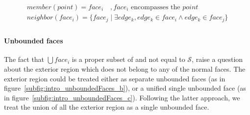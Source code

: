 \[
\begin{array}{l}
  \mathit{member}\left(point\right) = face_i \quad, face_i \text{ encompasses the } point \\
  \mathit{neighbor}\left(face_i\right) = \lbrace  face_j \mid \exists edge_k, edge_k \in face_i \land edge_k \in face_j \rbrace\\
\end{array}
\]

\paragraph{Unbounded faces}
The fact that $\bigcup face_i$ is a proper subset of and not equal to $\mathcal{S}$, raise a question about the exterior region which does not belong to any of the normal faces.
The exterior region could be treated either as separate unbounded faces (as in figure~\ref{subfig:intro_unboundedFaces_b}), or a unified single unbounded face (as in figure~\ref{subfig:intro_unboundedFaces_c}).
Following the latter approach, we treat the union of all the exterior region as a single unbounded face.

